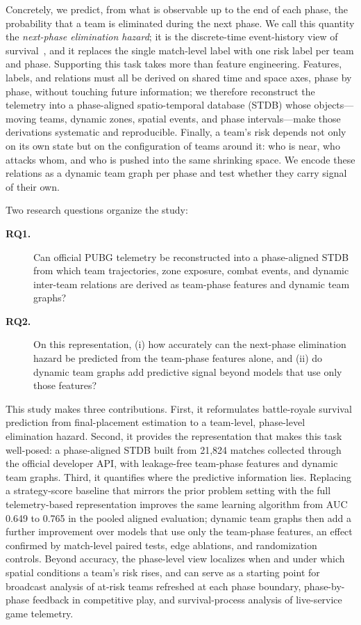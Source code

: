Concretely, we predict, from what is observable up to the end of each
phase, the probability that a team is eliminated during the next phase. We
call this quantity the \textit{next-phase elimination hazard}; it is the
discrete-time event-history view of
survival~\cite{allison1982discrete,singer1993discrete}, and it replaces the
single match-level label with one risk label per team and phase. Supporting
this task takes more than feature engineering. Features, labels, and
relations must all be derived on shared time and space axes, phase by
phase, without touching future information; we therefore reconstruct the
telemetry into a phase-aligned spatio-temporal database (STDB) whose
objects---moving teams, dynamic zones, spatial events, and phase
intervals---make those derivations systematic and reproducible. Finally, a
team's risk depends not only on its own state but on the configuration of
teams around it: who is near, who attacks whom, and who is pushed into the
same shrinking space. We encode these relations as a dynamic team graph per
phase and test whether they carry signal of their own.

Two research questions organize the study:
\begin{description}
  \item[\textbf{RQ1.}] Can official PUBG telemetry be reconstructed into a phase-aligned STDB from which team trajectories, zone exposure, combat events, and dynamic inter-team relations are derived as team-phase features and dynamic team graphs?
  \item[\textbf{RQ2.}] On this representation, (i) how accurately can the next-phase elimination hazard be predicted from the team-phase features alone, and (ii) do dynamic team graphs add predictive signal beyond models that use only those features?
\end{description}

This study makes three contributions. First, it reformulates battle-royale
survival prediction from final-placement estimation to a team-level,
phase-level elimination hazard. Second, it provides the representation that
makes this task well-posed: a phase-aligned STDB built from 21,824 matches
collected through the official developer API, with leakage-free team-phase
features and dynamic team graphs. Third, it quantifies where the predictive
information lies. Replacing a strategy-score baseline that mirrors the prior
problem setting with the full telemetry-based representation improves the
same learning algorithm from AUC 0.649 to 0.765 in the pooled aligned
evaluation; dynamic team graphs then add a further improvement over models
that use only the team-phase features, an effect confirmed by match-level
paired tests, edge ablations, and
randomization controls. Beyond accuracy, the phase-level view localizes when
and under which spatial conditions a team's risk rises, and can serve as a
starting point for broadcast analysis of at-risk teams refreshed at each
phase boundary, phase-by-phase
feedback in competitive play, and survival-process analysis of live-service
game telemetry.

